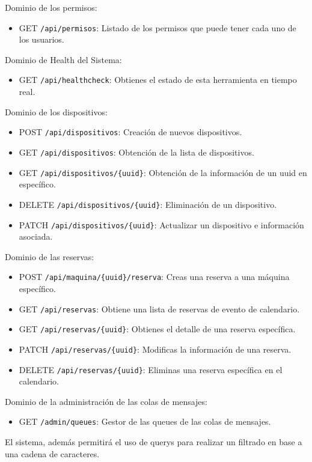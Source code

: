 Dominio de los permisos:

\begin{itemize}
  \item GET \texttt{/api/permisos}:  Listado de los permisos que puede tener cada uno de los usuarios. 
\end{itemize}

Dominio de Health del Sistema:

\begin{itemize}
  \item GET \texttt{/api/healthcheck}: Obtienes el estado de esta herramienta en tiempo real. 
\end{itemize}

Dominio de los dispositivos:

\begin{itemize}
  \item POST \texttt{/api/dispositivos}: Creación de nuevos dispositivos.
  \item GET \texttt{/api/dispositivos}: Obtención de la lista de dispositivos. 
  \item GET \texttt{/api/dispositivos/\{uuid\}}: Obtención de la información de un uuid en específico.
  \item DELETE \texttt{/api/dispositivos/\{uuid\}}: Eliminación de un dispositivo.
  \item PATCH \texttt{/api/dispositivos/\{uuid\}}: Actualizar un dispositivo e información asociada. 
\end{itemize}

Dominio de las reservas: 
\begin{itemize}
  \item POST \texttt{/api/maquina/\{uuid\}/reserva}: Creas una reserva a una máquina específico.
  \item GET \texttt{/api/reservas}: Obtiene una lista de reservas de evento de calendario.
  \item GET \texttt{/api/reservas/\{uuid\}}: Obtienes el detalle de una reserva específica. 
  \item PATCH \texttt{/api/reservas/\{uuid\}}: Modificas la información de una reserva.
  \item DELETE \texttt{/api/reservas/\{uuid\}}: Eliminas una reserva específica en el calendario.
\end{itemize}

Dominio de la administración de las colas de mensajes:

\begin{itemize}
  \item GET \texttt{/admin/queues}: Gestor de las queues de las colas de mensajes.
\end{itemize}

El sistema, además permitirá el uso de querys para realizar un filtrado en base a una cadena de caracteres.
